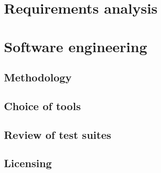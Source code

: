 \section{Requirements analysis}

\section{Software engineering}

\subsection{Methodology}

\subsection{Choice of tools}

\subsection{Review of test suites}

\subsection{Licensing}
